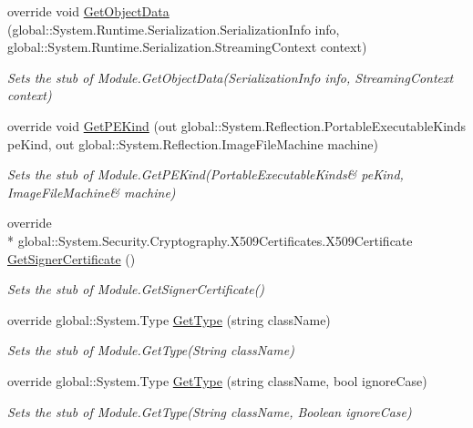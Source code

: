 \begin{DoxyCompactItemize}
override void \hyperlink{class_system_1_1_reflection_1_1_fakes_1_1_stub_module_a60168519e8ea3ef9146dce0fbc8e6ee6}{Get\-Object\-Data} (global\-::\-System.\-Runtime.\-Serialization.\-Serialization\-Info info, global\-::\-System.\-Runtime.\-Serialization.\-Streaming\-Context context)
\begin{DoxyCompactList}\small\item\em Sets the stub of Module.\-Get\-Object\-Data(\-Serialization\-Info info, Streaming\-Context context)\end{DoxyCompactList}\item 
override void \hyperlink{class_system_1_1_reflection_1_1_fakes_1_1_stub_module_af7d2429a245d4912d724d501195aa7b5}{Get\-P\-E\-Kind} (out global\-::\-System.\-Reflection.\-Portable\-Executable\-Kinds pe\-Kind, out global\-::\-System.\-Reflection.\-Image\-File\-Machine machine)
\begin{DoxyCompactList}\small\item\em Sets the stub of Module.\-Get\-P\-E\-Kind(Portable\-Executable\-Kinds\& pe\-Kind, Image\-File\-Machine\& machine)\end{DoxyCompactList}\item 
override \\*
global\-::\-System.\-Security.\-Cryptography.\-X509\-Certificates.\-X509\-Certificate \hyperlink{class_system_1_1_reflection_1_1_fakes_1_1_stub_module_ac61ff748f60a7c3d96fc9f730ac9a0c4}{Get\-Signer\-Certificate} ()
\begin{DoxyCompactList}\small\item\em Sets the stub of Module.\-Get\-Signer\-Certificate()\end{DoxyCompactList}\item 
override global\-::\-System.\-Type \hyperlink{class_system_1_1_reflection_1_1_fakes_1_1_stub_module_ae0b44f3e895316609659b9272039afa3}{Get\-Type} (string class\-Name)
\begin{DoxyCompactList}\small\item\em Sets the stub of Module.\-Get\-Type(\-String class\-Name)\end{DoxyCompactList}\item 
override global\-::\-System.\-Type \hyperlink{class_system_1_1_reflection_1_1_fakes_1_1_stub_module_ae88cc0a584947e5cd62a166a117facf4}{Get\-Type} (string class\-Name, bool ignore\-Case)
\begin{DoxyCompactList}\small\item\em Sets the stub of Module.\-Get\-Type(\-String class\-Name, Boolean ignore\-Case)\end{DoxyCompactList}\item 

\end{DoxyCompactItemize}
